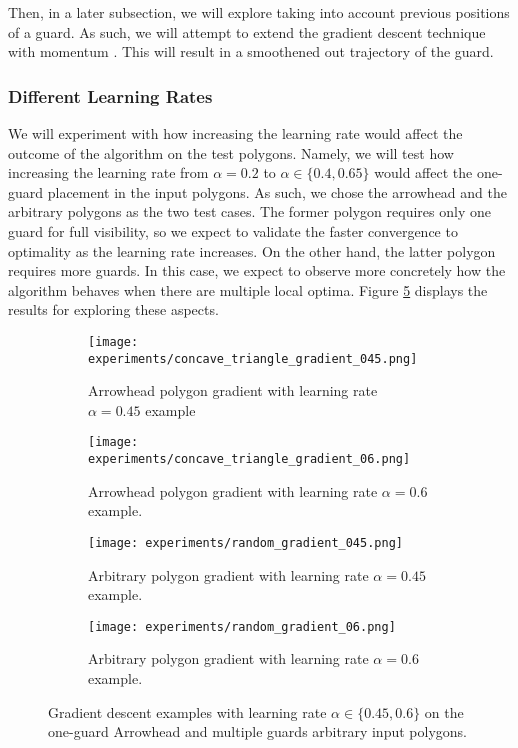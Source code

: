 Then, in a later subsection, we will explore taking into account previous positions of a guard. As such, we will attempt to extend the gradient descent technique with momentum \cite{goodfelow2016deep}. This will result in a smoothened out trajectory of the guard.

\subsubsection{Different Learning Rates}
We will experiment with how increasing the learning rate would affect the outcome of the algorithm on the test polygons. Namely, we will test how increasing the learning rate from $\alpha = 0.2$ to $\alpha \in \{0.4, 0.65\}$ would affect the one-guard placement in the input polygons. As such, we chose the arrowhead and the arbitrary polygons as the two test cases. The former polygon requires only one guard for full visibility, so we expect to validate the faster convergence to optimality as the learning rate increases. On the other hand, the latter polygon requires more guards. In this case, we expect to observe more concretely how the algorithm behaves when there are multiple local optima. Figure \ref{fig:multiple_gradients} displays the results for exploring these aspects. 

\begin{figure}[h!]
    \centering
    \begin{subfigure}{0.45\textwidth}
        \centering
        \texttt{[image: experiments/concave\_triangle\_gradient\_045.png]}
        \caption{Arrowhead polygon gradient with learning rate $\alpha = 0.45$ example}
        \label{fig:concave_gradient_045}
    \end{subfigure}
    \begin{subfigure}{0.45\textwidth}
        \centering
        \texttt{[image: experiments/concave\_triangle\_gradient\_06.png]}
        \caption{Arrowhead polygon gradient with learning rate $\alpha = 0.6$ example.}
        \label{fig:concave_gradient_06}
    \end{subfigure}
    \begin{subfigure}{0.45\textwidth}
        \centering
        \texttt{[image: experiments/random\_gradient\_045.png]}
        \caption{Arbitrary polygon gradient with learning rate $\alpha = 0.45$ example.}
        \label{fig:random_gradient_045}
    \end{subfigure}
    \begin{subfigure}{0.45\textwidth}
        \centering
        \texttt{[image: experiments/random\_gradient\_06.png]}
        \caption{Arbitrary polygon gradient with learning rate $\alpha = 0.6$ example.}
        \label{fig:random_gradient_06}
    \end{subfigure}
    \caption{Gradient descent examples with learning rate $\alpha \in \{0.45, 0.6\}$ on the one-guard Arrowhead and multiple guards arbitrary input polygons.}
    \label{fig:multiple_gradients}
\end{figure}

